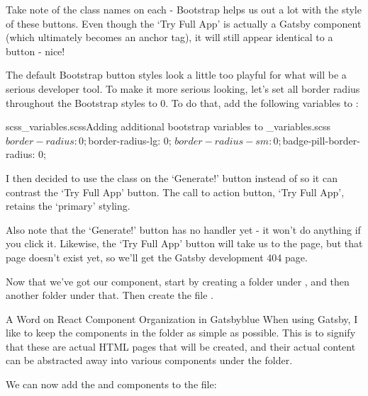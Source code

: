 \documentclass[a4paper,headinclude=on,footinclude=on,12pt,oneside]{scrbook}
\begin{document}
Take note of the class names on each - Bootstrap helps us out a lot with the style of these buttons. Even though the `Try Full App' is actually a Gatsby  component (which ultimately becomes an anchor tag), it will still appear identical to a button - nice! 


The default Bootstrap button styles look a little too playful for what will be a serious developer tool. To make it more serious looking, let's set all border radius throughout the Bootstrap styles to 0. To do that, add the following variables to :

\begin{codeInput}{scss}{\_variables.scss}{Adding additional bootstrap variables to \_variables.scss}
$border-radius: 0;
$border-radius-lg: 0;
$border-radius-sm: 0;
$badge-pill-border-radius: 0;
\end{codeInput}

I then decided to use the class  on the `Generate!' button instead of  so it can contrast the `Try Full App' button. The call to action button, `Try Full App', retains the `primary' styling. 

Also note that the `Generate!' button has no  handler yet - it won't do anything if you click it. Likewise, the `Try Full App' button will take us to the  page, but that page doesn't exist yet, so we'll get the Gatsby development 404 page.


Now that we've got our  component, start by creating a  folder under  , and then another folder  under that. Then create the file .

\begin{highlightBox}{A Word on React Component Organization in Gatsby}{blue}{\information}
When using Gatsby, I like to keep the components in the  folder as simple as possible. This is to signify that these are actual HTML pages that will be created, and their actual content can be abstracted away into various components under the  folder.
\end{highlightBox}

We can now add the  and  components to the   file:
\end{document}
